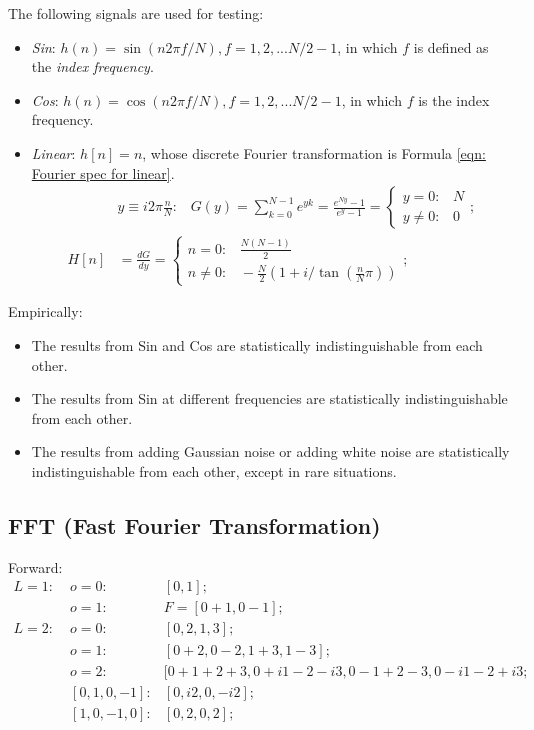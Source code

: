 \documentclass[twoside]{article}
\numberwithin{equation}{section}
\newcommand{\eqspace}{\;\;\;}
\begin{document}
The following signals are used for testing:
\begin{itemize}
\item \emph{Sin}: $h(n) = \sin(n 2\pi f/N), f = 1, 2, ... N/2 -1$, in which $f$ is defined as the \emph{index frequency}.

\item \emph{Cos}: $h(n) = \cos(n 2\pi f/N), f = 1, 2, ... N/2 -1$, in which $f$ is the index frequency.

\item \emph{Linear}: $h[n] = n$, whose discrete Fourier transformation is Formula \eqref{eqn: Fourier spec for linear}.
\begin{align}
& y \equiv i 2\pi \frac{n}{N}: \eqspace G(y) = \sum_{k=0}^{N-1}  e^{y k} = \frac{e^{N y} - 1}{e^y - 1}
 = \begin{cases} y = 0: \eqspace N \\ y \neq 0: \eqspace 0 \end{cases}; \nonumber \\
\label{eqn: Fourier spec for linear}
H[n] &= \frac{d G}{d y} = \begin{cases} n = 0: \eqspace \frac{N (N-1)}{2} \\ n \neq 0: \eqspace - \frac{N}{2}(1 + i /\tan(\frac{n}{N} \pi)) \end{cases};
\end{align}

\end{itemize}

Empirically:
\begin{itemize}
\item The results from Sin and Cos are statistically indistinguishable from each other.

\item The results from Sin at different frequencies are statistically indistinguishable from each other.

\item The results from adding Gaussian noise or adding white noise are statistically indistinguishable from each other, except in rare situations.
\end{itemize}


\subsection{FFT (Fast Fourier Transformation)}

\iffalse

Forward:
\begin{align*}
L = 1:\;& o=0: & [0, 1]; \\
 & o = 1: & F = [0 + 1, 0 - 1]; \\
L = 2:\;& o=0: & [0, 2, 1, 3]; \\
 & o = 1: & [0 + 2, 0 - 2, 1 + 3, 1 - 3]; \\
 & o = 2: & [0 + 1 + 2 + 3, 0 + i 1 - 2 - i 3 , 0 - 1 + 2 - 3, 0 - i 1 - 2 + i 3; \\
 & [0, 1, 0, -1]:& [0, i 2, 0, - i 2]; \\
 & [1, 0, -1, 0]:& [0, 2, 0, 2];
\end{align*}
\end{document}
